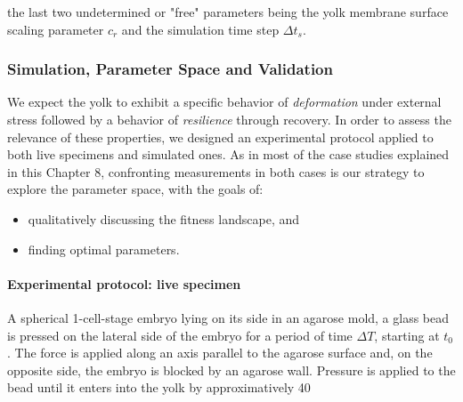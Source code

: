 the last two undetermined or "free" parameters being the yolk membrane surface scaling parameter $c_r$ and the simulation time step $\Delta\!t_s$.


\subsubsection{Simulation, Parameter Space and Validation }


We expect the yolk to exhibit a specific behavior of \textit{deformation} under external stress followed by a behavior of \textit{resilience} through recovery. In order to assess the relevance of these properties, we designed an experimental protocol applied to both live specimens and simulated ones. As in most of the case studies explained in this Chapter 8, confronting measurements in both cases is our strategy to explore the parameter space, with the goals of:
\begin{itemize}
	\item qualitatively discussing the fitness landscape, and
	\item finding optimal parameters.
\end{itemize}

\paragraph{Experimental protocol: live specimen}


A spherical 1-cell-stage embryo lying on its side in an agarose mold, a glass bead is pressed on the lateral side of the embryo for a period of time $\Delta\!T$, starting at $t_0$. The force is applied along an axis parallel to the agarose surface and, on the opposite side, the embryo is blocked by an agarose wall. Pressure is applied to the bead until it enters into the yolk by approximatively 40%


